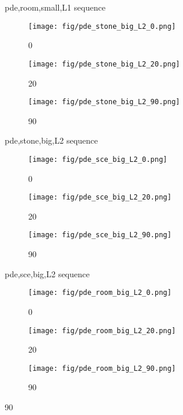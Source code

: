 \begin{figure}
  \caption{pde,room,small,L1 sequence}
  \label{fig:three_images}
\end{figure}\begin{figure} 
    \centering
    \begin{subfigure}[b]{0.3\textwidth}
    \texttt{[image: fig/pde\_stone\_big\_L2\_0.png]}
    \caption{0}
    \label{fig:image1}
  \end{subfigure}
  \hfill
  \begin{subfigure}[b]{0.3\textwidth}
    \texttt{[image: fig/pde\_stone\_big\_L2\_20.png]}
    \caption{20}
    \label{fig:image2}
  \end{subfigure}
  \hfill
  \begin{subfigure}[b]{0.3\textwidth}
    \texttt{[image: fig/pde\_stone\_big\_L2\_90.png]}
    \caption{90}
    \label{fig:image3}
  \end{subfigure}

  \caption{pde,stone,big,L2 sequence}
  \label{fig:three_images}
\end{figure}\begin{figure} 
    \centering
    \begin{subfigure}[b]{0.3\textwidth}
    \texttt{[image: fig/pde\_sce\_big\_L2\_0.png]}
    \caption{0}
    \label{fig:image1}
  \end{subfigure}
  \hfill
  \begin{subfigure}[b]{0.3\textwidth}
    \texttt{[image: fig/pde\_sce\_big\_L2\_20.png]}
    \caption{20}
    \label{fig:image2}
  \end{subfigure}
  \hfill
  \begin{subfigure}[b]{0.3\textwidth}
    \texttt{[image: fig/pde\_sce\_big\_L2\_90.png]}
    \caption{90}
    \label{fig:image3}
  \end{subfigure}

  \caption{pde,sce,big,L2 sequence}
  \label{fig:three_images}
\end{figure}\begin{figure} 
    \centering
    \begin{subfigure}[b]{0.3\textwidth}
    \texttt{[image: fig/pde\_room\_big\_L2\_0.png]}
    \caption{0}
    \label{fig:image1}
  \end{subfigure}
  \hfill
  \begin{subfigure}[b]{0.3\textwidth}
    \texttt{[image: fig/pde\_room\_big\_L2\_20.png]}
    \caption{20}
    \label{fig:image2}
  \end{subfigure}
  \hfill
  \begin{subfigure}[b]{0.3\textwidth}
    \texttt{[image: fig/pde\_room\_big\_L2\_90.png]}
    \caption{90}
    \label{fig:image3}
  \end{subfigure}


\end{figure}
